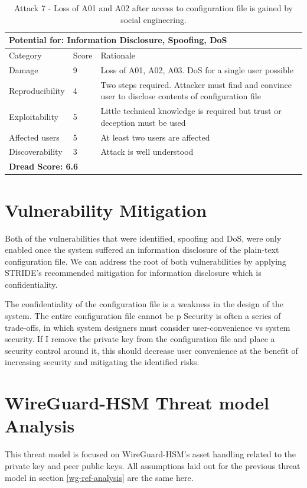 \documentclass [11pt, proquest] {uwthesis}[2020/02/24]
\begin{document}
\begin{table}[H]
\label{attack7-ref}
\begin{tabular}{|m{3cm}|m{.9cm}|p{27em} |}
\multicolumn{3}{l}{Potential for: Information Disclosure, Spoofing, DoS}                   \\
\hline
Category & Score & Rationale \\
\hline
Damage          & 9     & Loss of A01, A02, A03. DoS for a single user possible            \\
\hline
Reproducibility & 4     & Two steps required. Attacker must find and convince user to disclose contents of configuration file    \\
\hline
Exploitability & 5      & Little technical knowledge is required but trust or deception must be used   \\
\hline
Affected users  & 5     & At least two users are affected                      \\
\hline
Discoverability & 3     & Attack is well understood  \\
\hline
\multicolumn{3}{l}{\textbf{Dread Score: 6.6}} 
\end{tabular}
\caption{Attack 7 - Loss of A01 and A02 after access to configuration file is gained by social engineering.}
\end{table}


\section{Vulnerability Mitigation}
\label{vulns}
Both of the vulnerabilities that were identified, spoofing and DoS, were only enabled once the system suffered an information disclosure of the plain-text configuration file. We can address the root of both vulnerabilities by applying STRIDE's recommended mitigation for information disclosure which is confidentiality. 

The confidentiality of the configuration file is a weakness in the design of the system. The entire configuration file cannot be p
Security is often a series of trade-offs, in which system designers must consider user-convenience vs system security. If I remove the private key from the configuration file and place a security control around it, this should decrease user convenience at the benefit of increasing security and mitigating the identified risks.

\section{WireGuard-HSM Threat model Analysis}
\label{wg-hsm-analysis}
This threat model is focused on WireGuard-HSM's asset handling related to the private key and peer public keys. All assumptions laid out for the previous threat model in section \ref{wg-ref-analysis} are the same here.
\end{document}

